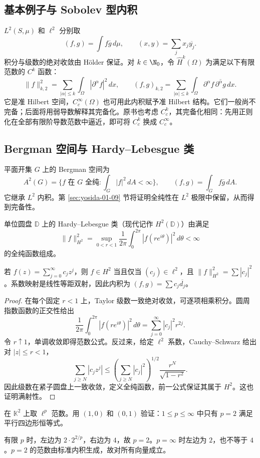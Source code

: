 \subsection{基本例子与 Sobolev 型内积}
$L^2(S,\mu)$ 和 $\ell^2$ 分别取
\[
 (f,g)=\int f\overline g\,d\mu,\qquad
 (x,y)=\sum_jx_j\overline{y_j}.
\]
积分与级数的绝对收敛由 Hölder 保证。对 $k\in\N_0$，令 $\widehat H^k(\Omega)$ 为满足以下有限范数的 $C^k$ 函数：
\[
 \|f\|_{k,2}^2=\sum_{|\alpha|\le k}\int_\Omega|\partial^\alpha f|^2\,dx,
 \qquad (f,g)_{k,2}=\sum_{|\alpha|\le k}\int_\Omega
 \partial^\alpha f\,\overline{\partial^\alpha g}\,dx.
\]
它是准 Hilbert 空间，$C_c^\infty(\Omega)$ 也可用此内积赋予准 Hilbert 结构。它们一般尚不完备；后面将用弱导数解释其完备化。原书也考虑 $C_c^k$，其完备化相同：先用正则化在全部有限阶导数范数中逼近，即可将 $C_c^k$ 换成 $C_c^\infty$。

\subsection{Bergman 空间与 Hardy--Lebesgue 类}
平面开集 $G$ 上的 Bergman 空间为
\[
 A^2(G)=\{f\text{ 在 }G\text{ 全纯}:\int_G|f|^2\,dA<\infty\},
 \qquad(f,g)=\int_Gf\overline g\,dA.
\]
它继承 $L^2$ 内积。第 \ref{sec:yosida-01-09} 节将证明全纯性在 $L^2$ 极限中保留，从而得到完备性。

单位圆盘 $\mathbb D$ 上的 Hardy--Lebesgue 类（现代记作 $H^2(\mathbb D)$）由满足
\[
 \|f\|_{H^2}^2=\sup_{0<r<1}\frac1{2\pi}
 \int_0^{2\pi}|f(re^{i\theta})|^2\,d\theta<\infty
\]
的全纯函数组成。
\begin{theorem}\label{thm:y1-hardy}
若 $f(z)=\sum_{j=0}^\infty c_jz^j$，则 $f\in H^2$ 当且仅当 $(c_j)\in\ell^2$，且 $\|f\|_{H^2}^2=\sum|c_j|^2$。系数映射是线性等距双射，因此内积为 $(f,g)=\sum c_j\overline{d_j}$。
\end{theorem}
\begin{proof}
在每个固定 $r<1$ 上，Taylor 级数一致绝对收敛，可逐项相乘积分。圆周指数函数的正交性给出
\[
 \frac1{2\pi}\int_0^{2\pi}|f(re^{i\theta})|^2\,d\theta
 =\sum_{j=0}^\infty|c_j|^2r^{2j}.
\]
令 $r\uparrow1$，单调收敛即得范数公式。反过来，给定 $\ell^2$ 系数，Cauchy--Schwarz 给出对 $|z|\le r<1$，
\[
 \sum_{j\ge N}|c_jz^j|
 \le\left(\sum_{j\ge N}|c_j|^2\right)^{1/2}
 \frac{r^N}{\sqrt{1-r^2}}.
\]
因此级数在紧子圆盘上一致收敛，定义全纯函数，前一公式保证其属于 $H^2$。这也证明满射性。
\end{proof}

\begin{exercise}[补充：哪些序列范数来自内积]
在 $\mathbb K^2$ 上取 $\ell^p$ 范数。用 $(1,0)$ 和 $(0,1)$ 验证：$1\le p\le\infty$ 中只有 $p=2$ 满足平行四边形恒等式。
\end{exercise}
\begin{solution}
有限 $p$ 时，左边为 $2\cdot2^{2/p}$，右边为 $4$，故 $p=2$。$p=\infty$ 时左边为 $2$，也不等于 $4$。$p=2$ 的范数由标准内积生成，故对所有向量成立。
\end{solution}
